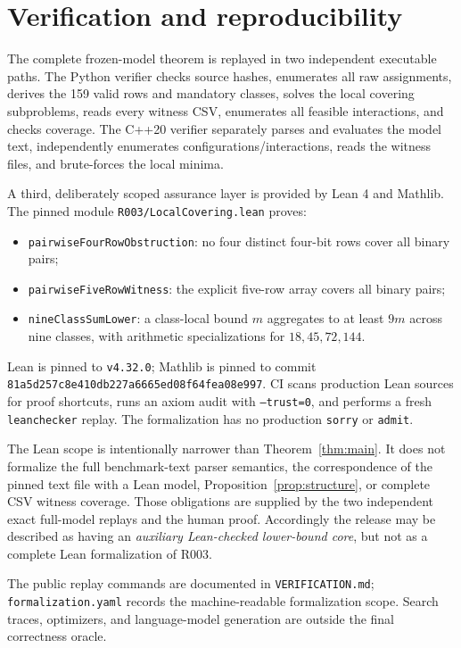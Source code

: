 \documentclass[11pt]{article}
\begin{document}
\section{Verification and reproducibility}
The complete frozen-model theorem is replayed in two independent executable
paths. The Python verifier checks source hashes, enumerates all raw assignments,
derives the 159 valid rows and mandatory classes, solves the local covering
subproblems, reads every witness CSV, enumerates all feasible interactions, and
checks coverage. The C++20 verifier separately parses and evaluates the model
text, independently enumerates configurations/interactions, reads the witness
files, and brute-forces the local minima.

A third, deliberately scoped assurance layer is provided by Lean 4 and Mathlib.
The pinned module \texttt{R003/LocalCovering.lean} proves:
\begin{itemize}
\item \texttt{pairwiseFourRowObstruction}: no four distinct four-bit rows cover
all binary pairs;
\item \texttt{pairwiseFiveRowWitness}: the explicit five-row array covers all
binary pairs;
\item \texttt{nineClassSumLower}: a class-local bound $m$ aggregates to at
least $9m$ across nine classes, with arithmetic specializations for
$18,45,72,144$.
\end{itemize}

Lean is pinned to \texttt{v4.32.0}; Mathlib is pinned to commit
\texttt{81a5d257c8e410db227a6665ed08f64fea08e997}. CI scans production Lean sources
for proof shortcuts, runs an axiom audit with \texttt{--trust=0}, and performs
a fresh \texttt{leanchecker} replay. The formalization has no production
\texttt{sorry} or \texttt{admit}.

The Lean scope is intentionally narrower than Theorem~\ref{thm:main}. It does
not formalize the full benchmark-text parser semantics, the correspondence of
the pinned text file with a Lean model, Proposition~\ref{prop:structure}, or
complete CSV witness coverage. Those obligations are supplied by the two
independent exact full-model replays and the human proof. Accordingly the
release may be described as having an \emph{auxiliary Lean-checked lower-bound
core}, but not as a complete Lean formalization of R003.

The public replay commands are documented in \texttt{VERIFICATION.md};
\texttt{formalization.yaml} records the machine-readable formalization scope.
Search traces, optimizers, and language-model generation are outside the final
correctness oracle.
\end{document}
